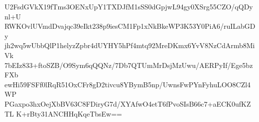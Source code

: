 U2FsdGVkX19fTms3OENxUpY1TXDJfM1sSS0dGpjwL94gy0XSrg55CZO/qQDynl+U
RWKOvlUVmdDvajqc39eIkt238p9iesCM1Fp1xNkBkeWP3K53Y0PiA6/ruILabGDy
jh2wq5wUbbQlP1helyzZpbr4dUYHY5hPf4mtq92MreDKmx6YvV8NzCdArmb8MiVk
7bEIz833+ftoSZB/O9Sym6qQQNz/7Db7QTUmMrDsjMzUwu/AERPyIf/Ege5bzFXb
ewHi59FSFf0lRqR51OxCFr8gD2tivcu8YBymB5np/UwnsFwPYnFyhuLOO8CZl4WP
PGaxpo3hxOejXbBV63C8FDiryG7d/XYAfwO4etT6fPvoSIsB66c7+aECK0ufKZTL
K+rBty31ANCHHqKqeTbsEw==
